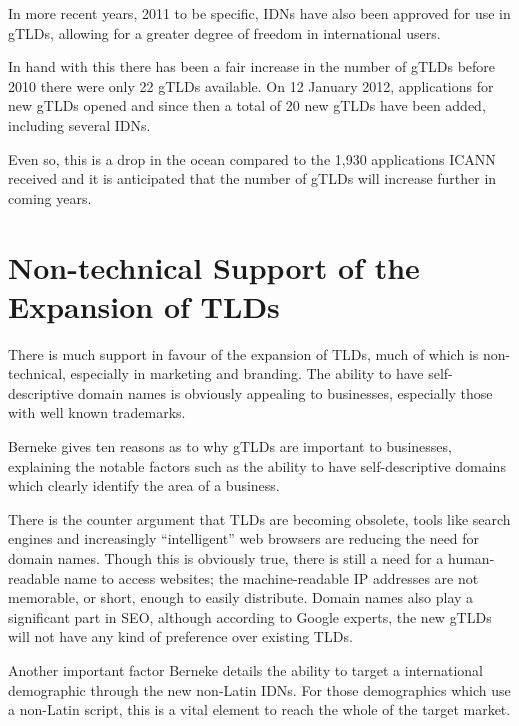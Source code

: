 \documentclass[11pt, a4paper]{article}
\begin{document}
In more recent years, 2011 to be specific, \glspl{IDN} have also been approved 
for use in \glspl{gTLD}, allowing for a greater degree of freedom in 
international users.

In hand with this there has been a fair increase in the number of \glspl{gTLD}
before 2010 there were only 22 \glspl{gTLD} available. On 12 January 2012,
applications for new \glspl{gTLD} opened and since then a total of 20 new 
\glspl{gTLD} have been added, including several \glspl{IDN}.

Even so, this is a drop in the ocean compared to the 1,930 applications 
\gls{ICANN} received and it is anticipated that the number of \glspl{gTLD} will
increase further in coming years.


\newpage
\section{Non-technical Support of the Expansion of TLDs}

There is much support in favour of the expansion of \glspl{TLD}, much of which
is non-technical, especially in marketing and branding. The ability to have 
self-descriptive domain names is obviously appealing to businesses, especially
those with well known trademarks.

Berneke\cite{berneke2013gtlds} gives ten reasons as to why \glspl{gTLD} are important
to businesses, explaining the notable factors such as the ability to have 
self-descriptive domains which clearly identify the area of a business.

There is the counter argument that \glspl{TLD} are becoming 
obsolete\cite{leiba2009good}, tools like search engines and increasingly
``intelligent'' web browsers are reducing the need for domain names. Though
this is obviously true, there is still a need for a human-readable name to 
access websites; the machine-readable IP addresses are not memorable, or short,
enough to easily distribute. Domain names also play a significant part in 
\gls{SEO}, although according to Google experts, the new \glspl{gTLD} will not
have any kind of preference over existing \glspl{TLD}\cite{cutts2012google}.

Another important factor Berneke details the ability to target a international
demographic through the new non-Latin \glspl{IDN}. For those demographics which
use a non-Latin script, this is a vital element to reach the whole of the
target market.
\end{document}
